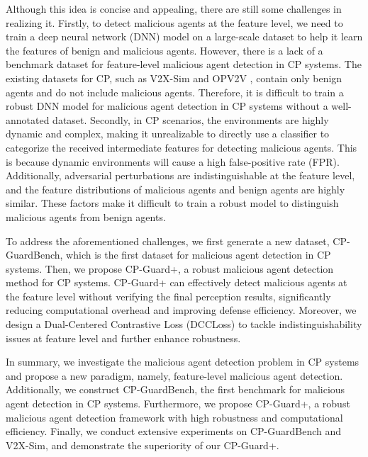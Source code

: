 Although this idea is concise and appealing, there are still some challenges in realizing it. Firstly, to detect malicious agents at the feature level, we need to train a deep neural network (DNN) model on a large-scale dataset to help it learn the features of benign and malicious agents. However, there is a lack of a benchmark dataset for feature-level malicious agent detection in CP systems. The existing datasets for CP, such as V2X-Sim \citep{liV2XSimMultiAgentCollaborative2022} and OPV2V \citep{xuOPV2VOpenBenchmark2022}, contain only benign agents and do not include malicious agents. 
Therefore, it is difficult to train a robust DNN model for malicious agent detection in CP systems without a well-annotated dataset. 
Secondly, in CP scenarios, the environments are highly dynamic and complex, making it unrealizable to directly use a classifier to categorize the received intermediate features for detecting malicious agents. This is because dynamic environments will cause a high false-positive rate (FPR). Additionally, adversarial perturbations are indistinguishable at the feature level, and the feature distributions of malicious agents and benign agents are highly similar. These factors make it difficult to train a robust model to distinguish malicious agents from benign agents.

To address the aforementioned challenges, we first generate a new dataset, CP-GuardBench, which is the first dataset for malicious agent detection in CP systems. Then, we propose CP-Guard+, a robust malicious agent detection method for CP systems.
CP-Guard+ can effectively detect malicious agents at the feature level without verifying the final perception results, significantly reducing computational overhead and improving defense efficiency. Moreover, we design a Dual-Centered Contrastive Loss (DCCLoss) to tackle indistinguishability issues at feature level and further enhance robustness. 


In summary, we investigate the malicious agent detection problem in CP systems and propose a new paradigm, namely, feature-level malicious agent detection. Additionally, we construct CP-GuardBench, the first benchmark for malicious agent detection in CP systems. Furthermore, we propose CP-Guard+, a robust malicious agent detection framework with high robustness and computational efficiency. Finally, we conduct extensive experiments on CP-GuardBench and V2X-Sim, and demonstrate the superiority of our CP-Guard+.
